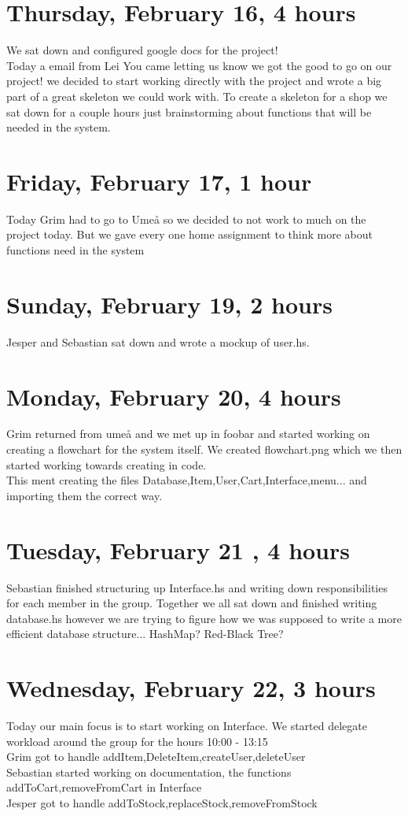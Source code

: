 \documentclass[11pt]{article}
\begin{document}
\section*{Thursday, February 16, 4 hours}
We sat down and configured google docs for the project! \\
Today a email from Lei You came letting us know we got the good to go on our project!
we decided to start working directly with the project and wrote a big part of a great skeleton we could work with.
To create a skeleton for a shop we sat down for a couple hours just brainstorming about functions that will be needed in the system.
\section*{Friday, February 17, 1 hour}
Today Grim had to go to Umeå so we decided to not work to much on the project today.
But we gave every one home assignment to think more about functions need in the system
\section*{Sunday, February 19, 2 hours}
Jesper and Sebastian sat down and wrote a mockup of user.hs.
\section*{Monday, February 20, 4 hours}
Grim returned from umeå and we met up in foobar and started working on creating a flowchart for the system itself. We created flowchart.png which we then started working towards creating in code. \\
This ment creating the files Database,Item,User,Cart,Interface,menu... and importing them the correct way.
\section*{Tuesday, February 21 , 4 hours }
Sebastian finished structuring up Interface.hs and writing down responsibilities for each member in the group.
Together we all sat down and finished writing database.hs however we are trying to figure how we was supposed to write a more efficient database structure... HashMap? Red-Black Tree?
\section*{Wednesday, February 22, 3 hours }
Today our main focus is to start working on Interface. We started delegate workload around the group for the hours 10:00 - 13:15 \\
Grim got to handle addItem,DeleteItem,createUser,deleteUser \\
Sebastian started working on documentation, the functions addToCart,removeFromCart in Interface \\
Jesper got to handle addToStock,replaceStock,removeFromStock \\
\end{document}
